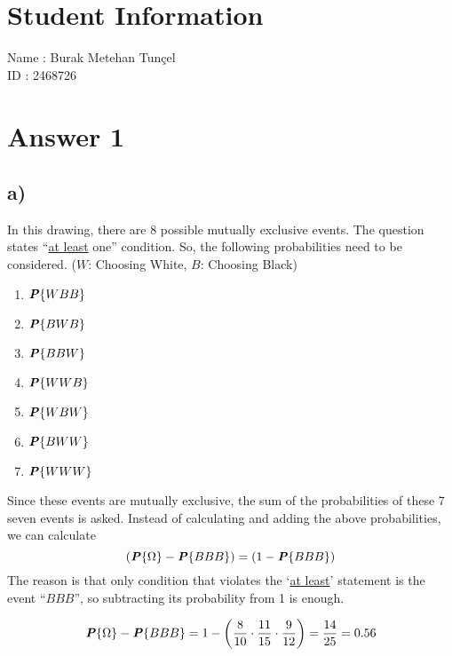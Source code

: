 \documentclass[12pt]{article}
\newcommand{\prob}[1]{\textbf{\textit{P}}\{#1\}}
\begin{document}
\section*{Student Information}

Name : Burak Metehan Tunçel\\

ID : 2468726\\


\section*{Answer 1}

\subsection*{a)}

In this drawing, there are 8 possible mutually exclusive events. The question states ``\underline{at least} one'' condition. So, the following probabilities need to be considered. ($W$: Choosing White, $B$: Choosing Black)

\begin{multicols}{4}
    \begin{enumerate}
        \item $\prob{WBB}$
        \item $\prob{BWB}$
        \item $\prob{BBW}$
        \item $\prob{WWB}$
        \item $\prob{WBW}$
        \item $\prob{BWW}$
        \item $\prob{WWW}$
    \end{enumerate}
\end{multicols}

\noindent Since these events are mutually exclusive, the sum of the probabilities of these 7 seven events is asked. Instead of calculating and adding the above probabilities, we can calculate
\begin{equation*}
    \left( \prob{\Omega} - \prob{BBB} \right) = \left( 1 - \prob{BBB} \right)
\end{equation*}
The reason is that only condition that violates the `\underline{at least}' statement is the event ``$BBB$'', so subtracting its probability from 1 is enough.

\begin{equation*}
    \prob{\Omega} - \prob{BBB} = 1 - \left( \frac{8}{10} \cdot \frac{11}{15} \cdot \frac{9}{12} \right) = \frac{14}{25} = 0.56
\end{equation*}
\end{document}
